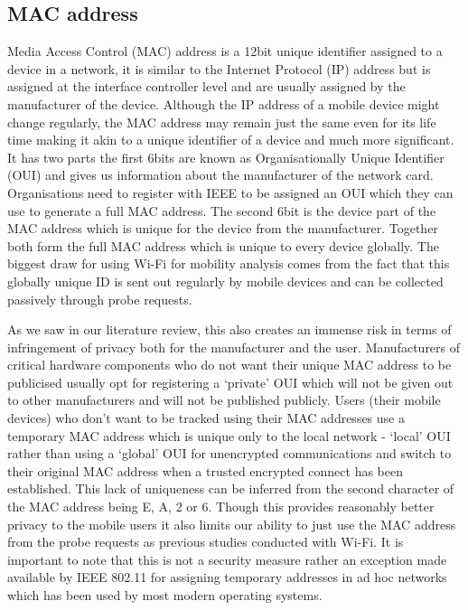\subsection{MAC address}
Media Access Control (MAC) address is a 12bit unique identifier assigned to a device in a network, it is similar to the Internet Protocol (IP) address but is assigned at the interface controller level and are usually assigned by the manufacturer of the device.
Although the IP address of a mobile device might change regularly, the MAC address may remain just the same even for its life time making it akin to a unique identifier of a device and much more significant.
It has two parts the first 6bits are known as Organisationally Unique Identifier (OUI) and gives us information about the manufacturer of the network card.
Organisations need to register with IEEE to be assigned an OUI which they can use to generate a full MAC address.
The second 6bit is the device part of the MAC address which is unique for the device from the manufacturer.
Together both form the full MAC address which is unique to every device globally.
The biggest draw for using Wi-Fi for mobility analysis comes from the fact that this globally unique ID is sent out regularly by mobile devices and can be collected passively through probe requests.

As we saw in our literature review, this also creates an immense risk in terms of infringement of privacy both for the manufacturer and the user.
Manufacturers of critical hardware components who do not want their unique MAC address to be publicised usually opt for registering a `private' OUI which will not be given out to other manufacturers and will not be published publicly.
Users (their mobile devices) who don't want to be tracked using their MAC addresses use a temporary MAC address which is unique only to the local network - `local' OUI rather than using a `global' OUI for unencrypted communications and switch to their original MAC address when a trusted encrypted connect has been established.
This lack of uniqueness can be inferred from the second character of the MAC address being E, A, 2 or 6.
Though this provides reasonably better privacy to the mobile users it also limits our ability to just use the MAC address from the probe requests as previous studies conducted with Wi-Fi.
It is important to note that this is not a security measure rather an exception made available by IEEE 802.11 for assigning temporary addresses in ad hoc networks which has been used by most modern operating systems.

